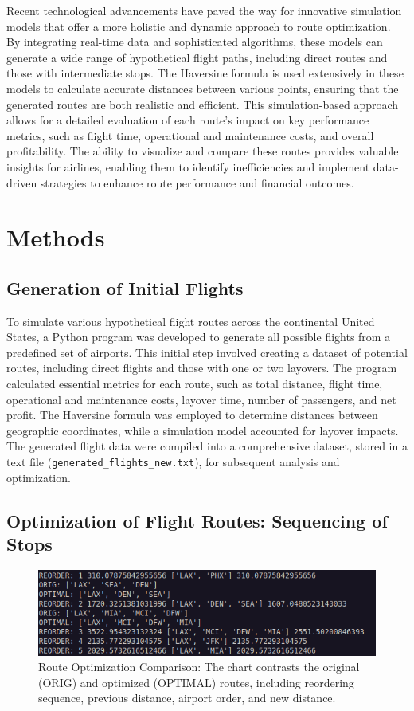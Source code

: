 \documentclass{article}
\begin{document}
Recent technological advancements have paved the way for innovative simulation models that offer a more holistic and dynamic approach to route optimization. By integrating real-time data and sophisticated algorithms, these models can generate a wide range of hypothetical flight paths, including direct routes and those with intermediate stops. The Haversine formula is used extensively in these models to calculate accurate distances between various points, ensuring that the generated routes are both realistic and efficient. This simulation-based approach allows for a detailed evaluation of each route's impact on key performance metrics, such as flight time, operational and maintenance costs, and overall profitability. The ability to visualize and compare these routes provides valuable insights for airlines, enabling them to identify inefficiencies and implement data-driven strategies to enhance route performance and financial outcomes.

\section{Methods}
\subsection*{Generation of Initial Flights}
To simulate various hypothetical flight routes across the continental United States, a Python program was developed to generate all possible flights from a predefined set of airports. This initial step involved creating a dataset of potential routes, including direct flights and those with one or two layovers. The program calculated essential metrics for each route, such as total distance, flight time, operational and maintenance costs, layover time, number of passengers, and net profit. The Haversine formula was employed to determine distances between geographic coordinates, while a simulation model accounted for layover impacts. The generated flight data were compiled into a comprehensive dataset, stored in a text file (\texttt{generated\_flights\_new.txt}), for subsequent analysis and optimization. 

\subsection*{Optimization of Flight Routes: Sequencing of Stops}
\begin{figure}[h!] %
\centering
\includegraphics[width=\textwidth]{images/sorting_alg.png}
\caption{Route Optimization Comparison: The chart contrasts the original (ORIG) and optimized (OPTIMAL) routes, including reordering sequence, previous distance, airport order, and new distance.}
\label{fig:sorting}
\end{figure}
\end{document}

